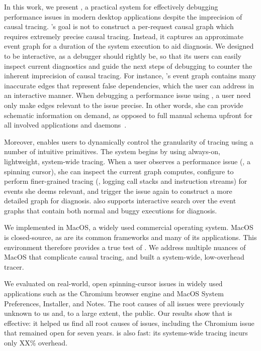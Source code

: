 In this work, we present \xxx, a practical system for effectively debugging
performance issues in modern desktop applications despite the imprecision of
causal tracing.  \xxx's goal is not to construct a per-request causal
graph which requires extremely precise causal tracing.  Instead, it
captures an approximate event graph for a duration of the system execution
to aid diagnosis.
We designed \xxx to be interactive, as a debugger should rightly be,
so that its users can easily inspect current diagnostics and guide the next
steps of debugging to counter the inherent imprecision of causal tracing. For
instance, \xxx's event graph contains many inaccurate edges that represent
false dependencies, which the user can address in an interactive manner.
When debugging a performance issue using \xxx, a user need only make edges
relevant to the issue precise.  In other words, she can provide schematic
information on demand, as opposed to full manual schema upfront for all
involved applications and daemons~\cite{magpie}.

Moreover, \xxx enables users to dynamically control the granularity of
tracing using a number of intuitive primitives. The system begins by using
always-on, lightweight, system-wide tracing.  When a user observes a
performance issue (\eg, a spinning cursor), she can inspect the current
graph \xxx computes, configure \xxx to perform finer-grained tracing (\eg,
logging call stacks and instruction streams) for events she deems
relevant, and trigger the issue again to construct a more detailed graph for diagnosis.  \xxx also
supports interactive search over the event graphs that contain both normal
and buggy executions for diagnosis.

We implemented \xxx in MacOS, a widely used commercial operating system. MacOS
is closed-source, as are its common frameworks and many of its applications.
This environment therefore provides a true test of \xxx.  We address multiple
nuances of MacOS that complicate causal tracing, and built a system-wide,
low-overhead tracer.

We evaluated \xxx on \nbug real-world, open spinning-cursor issues in
widely used applications such as the Chromium browser engine and MacOS
System Preferences, Installer, and Notes.  The root causes of all \nbug
issues were previously unknown to us and, to a large extent, the
public. Our results show that \xxx is effective: it helped us find all
root causes of issues, including the Chromium issue that remained open for
seven years.  \xxx is also fast: its systems-wide tracing incurs only XX\%
overhead.

